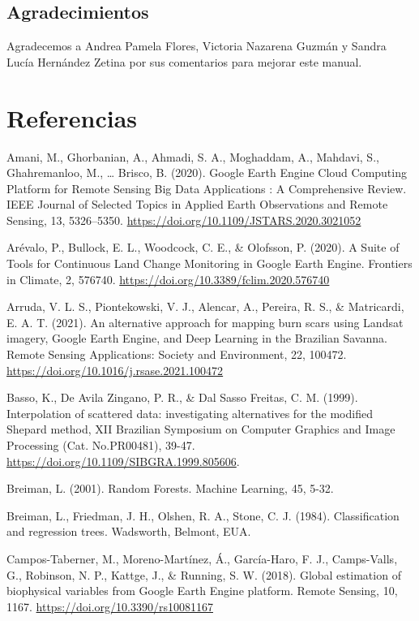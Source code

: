 \documentclass[
  12pt,
  letterpaper,
  twoside]{book}
\begin{document}
\hypertarget{agradecimientos}{%
\section{Agradecimientos}\label{agradecimientos}}

Agradecemos a Andrea Pamela Flores, Victoria Nazarena Guzmán y Sandra Lucía Hernández Zetina por sus comentarios para mejorar este manual.

\newpage
\backmatter

\hypertarget{referencias}{%
\chapter{Referencias}\label{referencias}}

Amani, M., Ghorbanian, A., Ahmadi, S. A., Moghaddam, A., Mahdavi, S., Ghahremanloo, M., \ldots{} Brisco, B. (2020). Google Earth Engine Cloud Computing Platform for Remote Sensing Big Data Applications : A Comprehensive Review. IEEE Journal of Selected Topics in Applied Earth Observations and Remote Sensing, 13, 5326--5350. \url{https://doi.org/10.1109/JSTARS.2020.3021052}

Arévalo, P., Bullock, E. L., Woodcock, C. E., \& Olofsson, P. (2020). A Suite of Tools for Continuous Land Change Monitoring in Google Earth Engine. Frontiers in Climate, 2, 576740. \url{https://doi.org/10.3389/fclim.2020.576740}

Arruda, V. L. S., Piontekowski, V. J., Alencar, A., Pereira, R. S., \& Matricardi, E. A. T. (2021). An alternative approach for mapping burn scars using Landsat imagery, Google Earth Engine, and Deep Learning in the Brazilian Savanna. Remote Sensing Applications: Society and Environment, 22, 100472. \url{https://doi.org/10.1016/j.rsase.2021.100472}

Basso, K., De Avila Zingano, P. R., \& Dal Sasso Freitas, C. M. (1999). Interpolation of scattered data: investigating alternatives for the modified Shepard method, XII Brazilian Symposium on Computer Graphics and Image Processing (Cat. No.PR00481), 39-47. \url{https://doi.org/10.1109/SIBGRA.1999.805606}.

Breiman, L. (2001). Random Forests. Machine Learning, 45, 5-32.

Breiman, L., Friedman, J. H., Olshen, R. A., Stone, C. J. (1984). Classification and regression trees. Wadsworth, Belmont, EUA.

Campos-Taberner, M., Moreno-Martínez, Á., García-Haro, F. J., Camps-Valls, G., Robinson, N. P., Kattge, J., \& Running, S. W. (2018). Global estimation of biophysical variables from Google Earth Engine platform. Remote Sensing, 10, 1167. \url{https://doi.org/10.3390/rs10081167}
\end{document}
